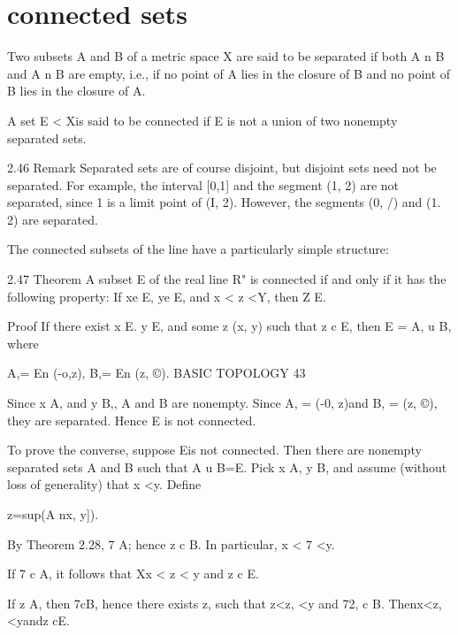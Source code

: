 \section{connected sets}

Two subsets A and B of a metric space X are said to be
separated if both A n B and A n B are empty, i.e., if no point of A lies in the
closure of B and no point of B lies in the closure of A.

A set E < Xis said to be connected if E is not a union of two nonempty
separated sets.

2.46 Remark Separated sets are of course disjoint, but disjoint sets need not
be separated. For example, the interval [0,1] and the segment (1, 2) are not
separated, since 1 is a limit point of (I, 2). However, the segments (0, /) and
(1. 2) are separated.

The connected subsets of the line have a particularly simple structure:

2.47 Theorem A subset E of the real line R" is connected if and only if it has the
following property: If xe E, ye E, and x < z <Y, then Z \in  E.

Proof If there exist x \in  E. y \in E, and some z \in (x, y) such that z c E, then
E = A, u B, where

A,= En (-o,z), B,= En (z, ©).
BASIC TOPOLOGY 43

Since x \in A, and y \in B,, A and B are nonempty. Since A, = (-0, z)and
B, = (z, ©), they are separated. Hence E is not connected.

To prove the converse, suppose Eis not connected. Then there are
nonempty separated sets A and B such that A u B=E. Pick x \in  A, y \in  B,
and assume (without loss of generality) that x <y. Define

z=sup(A nx, y]).

By Theorem 2.28, 7 \in A; hence z c B. In particular, x < 7 <y.

If 7 c A, it follows that Xx < z < y and z c E.

If z \in  A, then 7cB, hence there exists z, such that z<z, <y and
72, c B. Thenx<z, <yandz cE.